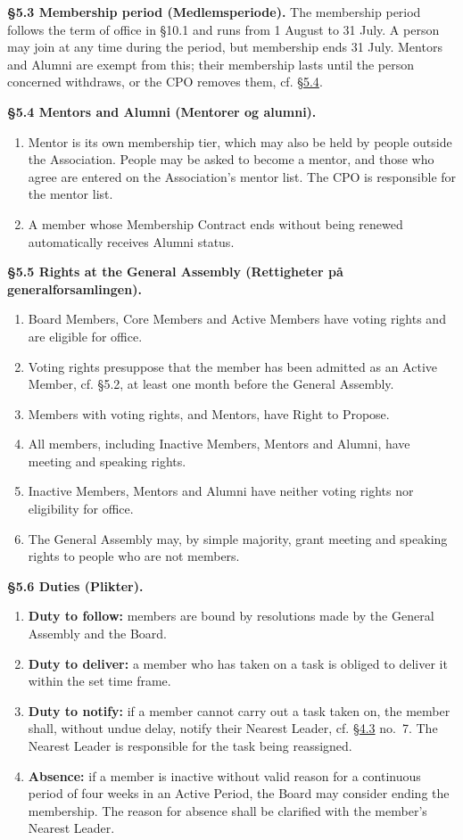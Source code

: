 \documentclass{../../../Common/Latex/Templates/rapport}
\begin{document}
\textbf{\S 5.3 Membership period (Medlemsperiode).}\label{bylaw:5.3} The membership period follows the term of office in \S10.1 and runs from 1 August to 31 July. A person may join at any time during the period, but membership ends 31 July. Mentors and Alumni are exempt from this; their membership lasts until the person concerned withdraws, or the CPO removes them, cf. \hyperref[bylaw:5.4]{\S 5.4}.

\textbf{\S 5.4 Mentors and Alumni (Mentorer og alumni).}\label{bylaw:5.4}
\begin{enumerate}
  \item Mentor is its own membership tier, which may also be held by people outside the Association. People may be asked to become a mentor, and those who agree are entered on the Association's mentor list. The CPO is responsible for the mentor list.
  \item A member whose Membership Contract ends without being renewed automatically receives Alumni status.
\end{enumerate}

\textbf{\S 5.5 Rights at the General Assembly (Rettigheter på generalforsamlingen).}\label{bylaw:5.5}
\begin{enumerate}
  \item Board Members, Core Members and Active Members have voting rights and are eligible for office.
  \item Voting rights presuppose that the member has been admitted as an Active Member, cf. \S5.2, at least one month before the General Assembly.
  \item Members with voting rights, and Mentors, have Right to Propose.
  \item All members, including Inactive Members, Mentors and Alumni, have meeting and speaking rights.
  \item Inactive Members, Mentors and Alumni have neither voting rights nor eligibility for office.
  \item The General Assembly may, by simple majority, grant meeting and speaking rights to people who are not members.
\end{enumerate}

\textbf{\S 5.6 Duties (Plikter).}\label{bylaw:5.6}
\begin{enumerate}
  \item \textbf{Duty to follow:} members are bound by resolutions made by the General Assembly and the Board.
  \item \textbf{Duty to deliver:} a member who has taken on a task is obliged to deliver it within the set time frame.
  \item \textbf{Duty to notify:} if a member cannot carry out a task taken on, the member shall, without undue delay, notify their Nearest Leader, cf. \hyperref[bylaw:4.3]{\S 4.3} no.\ 7. The Nearest Leader is responsible for the task being reassigned.
  \item \textbf{Absence:} if a member is inactive without valid reason for a continuous period of four weeks in an Active Period, the Board may consider ending the membership. The reason for absence shall be clarified with the member's Nearest Leader.
\end{enumerate}
\end{document}
